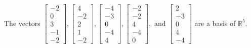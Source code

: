 \begin{exercise}
\begin{exerciseStatement}
  \end{exerciseStatement}
  \begin{exerciseAnswer}
   The vectors \(\left[\begin{array}{r}
-2 \\
0 \\
3 \\
-1 \\
-2
\end{array}\right] , \left[\begin{array}{r}
4 \\
-2 \\
2 \\
1 \\
-2
\end{array}\right] , \left[\begin{array}{r}
-4 \\
-3 \\
0 \\
-4 \\
4
\end{array}\right] , \left[\begin{array}{r}
-2 \\
-2 \\
4 \\
-4 \\
0
\end{array}\right] , \text{ and } \left[\begin{array}{r}
2 \\
-3 \\
0 \\
4 \\
-4
\end{array}\right]\) 
  	 are  a basis of \(\mathbb{R}^5\).
  


  \end{exerciseAnswer}
\end{exercise}